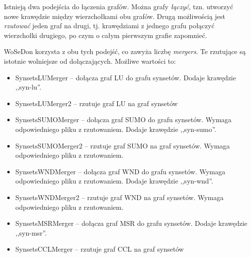 \documentclass[10pt,a4paper]{article}
\begin{document}
Istnieją dwa podejścia do łączenia grafów. Można grafy \emph{łączyć}, tzn. utworzyć nowe krawędzie między wierzchołkami obu grafów. Drugą możliwością jest \emph{rzutować} jeden graf na drugi, tj. krawędziami z jednego grafu połączyć wierzchołki drugiego, po czym o całym pierwszym grafie zapomnieć.

WoSeDon korzysta z obu tych podejść, co zawyża liczbę \textit{mergers}. Te rzutujące są istotnie wolniejsze od dołączających. Możliwe wartości to:
\begin{itemize}
	\item SynsetsLUMerger -- dołącza graf LU do grafu synsetów. Dodaje krawędzie ,,syn-lu''.
	\item SynsetsLUMerger2 -- rzutuje graf LU na graf synsetów
	\item SynsetsSUMOMerger -- dołącza graf SUMO do grafu synsetów. Wymaga odpowiedniego pliku z rzutowaniem. Dodaje krawędzie ,,syn-sumo''.
	\item SynsetsSUMOMerger2 -- rzutuje graf SUMO na graf synsetów. Wymaga odpowiedniego pliku z rzutowaniem.
	\item SynsetsWNDMerger -- dołącza graf WND do grafu synsetów. Wymaga odpowiedniego pliku z rzutowaniem. Dodaje krawędzie ,,syn-wnd''.
	\item SynsetsWNDMerger2 -- rzutuje graf WND na graf synsetów. Wymaga odpowiedniego pliku z rzutowaniem.
	\item SynsetsMSRMerger -- dołącza graf MSR do grafu synsetów. Dodaje krawędzie ,,syn-msr''.
	\item SynsetsCCLMerger -- rzutuje graf CCL na graf synsetów
\end{itemize}
\end{document}
